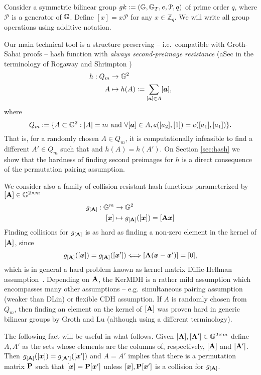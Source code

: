 Consider a symmetric bilinear group $gk:=(\mathbb{G},\mathbb{G}_T,e,\mathcal{P},q)$ of prime order $q$, where $\mathcal{P}$ is a generator of $\mathbb{G}$. Define $[x]=x\mathcal{P}$ for any $x\in\mathbb{Z}_q$.  We will write all group operations using additive notation.

Our main technical tool is a structure preserving -- i.e.~compatible with Groth-Sahai proofs -- hash function with \emph{always second-preimage resistance} (aSec in the terminology of Rogaway and Shrimpton \cite{FSE:RogShr04})
\begin{align*}
h : Q_m &\to \mathbb{G}^2\\
      A &\mapsto h(A) := \sum_{[{\boldsymbol{a}}]\in A} [{\boldsymbol{a}}],
\end{align*}
 where
$$
Q_m:= \{A\subset\mathbb{G}^2: |A|=m \text{ and }\forall [{\boldsymbol{a}}]\in A, e([a_2],[1])=e([a_1],[a_1])\}.
$$
That is, for a randomly chosen $A\in Q_m$, it is computationally infeasible to find a different $A'\in Q_m$ such that and $h(A)=h(A')$. On Section \ref{sec:hash} we show that the hardness of finding second preimages for $h$ is a direct consequence of the permutation pairing assumption.

We consider also a family of collision resistant hash functions parameterized by $[\mathbf{{A}}]\in\mathbb{G}^{2\times m}$
\begin{align*}
g_{[\matr{A}]} : \GG^m &\to \GG^2\\
           [\vecb{x}] &\mapsto g_{[\matr{A}]}([\vecb{x}]) = [\matr{A}\vecb{x}]
\end{align*} 
 Finding collisions for $g_{[\mathbf{{A}}]}$ is as hard as finding a non-zero element in the kernel of $[\mathbf{{A}}]$, since
$$
g_{[\mathbf{{A}}]}([{\boldsymbol{x}}]) = g_{[\mathbf{{A}}]}([{\boldsymbol{x}}']) \Longleftrightarrow [\mathbf{{A}}({\boldsymbol{x}}-{\boldsymbol{x}}')]=[0],
$$
which is in general a hard problem known as kernel matrix Diffie-Hellman assumption~\cite{AC:MorRafVil16}. Depending on $\mathbf{{A}}$, the KerMDH is a rather mild assumption which encompasses many other assumptions -- e.g.~simultaneous pairing assumption (weaker than DLin) or flexible CDH assumption. If $A$ is randomly chosen from $Q_m$, then finding an element on the kernel of $[\mathbf{{A}}]$ was proven hard in generic bilinear groups by Groth and Lu \cite{AC:GroLu07} (although using a different terminology).


The following fact will be useful in what follows. Given $[\mathbf{{A}}],[\mathbf{{A}}']\in\mathbb{G}^{2\times m}$ define $A,A'$ as the sets whose elements are the columns of, respectively, $[\mathbf{{A}}]$ and $[\mathbf{{A}}']$. Then $g_{[\mathbf{{A}}]}([{\boldsymbol{x}}]) = g_{[\mathbf{{A}}']}([{\boldsymbol{x}}'])$ and $A=A'$ implies that there is a permutation matrix $\mathbf{{P}}$ such that $[{\boldsymbol{x}}]=\mathbf{{P}}[{\boldsymbol{x}}']$ unless $[{\boldsymbol{x}}],\mathbf{{P}}[{\boldsymbol{x}}']$ is a collision for $g_{[\mathbf{{A}}]}$.

